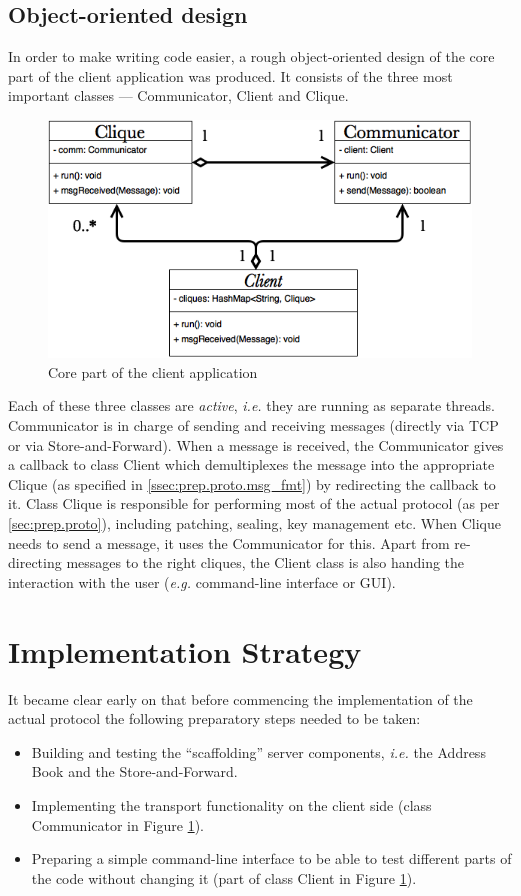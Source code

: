 \documentclass[a4paper, 12pt]{report}
\begin{document}
\subsection{Object-oriented design}
In order to make writing code easier, a rough object-oriented design of the core part of the client application was produced. It consists of the three most important classes --- Communicator, Client and Clique.

\begin{figure}[H]
    \centering
    \includegraphics[width = 0.7 \linewidth]{pics/core_uml.png}
    \caption{\label{fig:core_uml} Core part of the client application}
\end{figure}

Each of these three classes are \emph{active}, \textit{i.e.} they are running as separate threads. Communicator is in charge of sending and receiving messages (directly via TCP or via Store-and-Forward). When a message is received, the Communicator gives a callback to class Client which demultiplexes the message into the appropriate Clique (as specified in \cref{ssec:prep.proto.msg_fmt}) by redirecting the callback to it. Class Clique is responsible for performing most of the actual protocol (as per \cref{sec:prep.proto}), including patching, sealing, key management etc. When Clique needs to send a message, it uses the Communicator for this. Apart from re-directing messages to the right cliques, the Client class is also handing the interaction with the user (\textit{e.g.} command-line interface or GUI).

\section{Implementation Strategy}
\label{sec:prep.impl_strat}
It became clear early on that before commencing the implementation of the actual protocol the following preparatory steps needed to be taken:
\begin{itemize}
    \item Building and testing the ``scaffolding'' server components, \textit{i.e.} the Address Book and the Store-and-Forward.
    \item Implementing the transport functionality on the client side (class Communicator in Figure \ref{fig:core_uml}).
    \item Preparing a simple command-line interface to be able to test different parts of the code without changing it (part of class Client in Figure \ref{fig:core_uml}).
\end{itemize}
\end{document}

